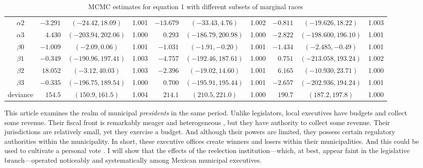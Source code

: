 \begin{table}
{\begin{tabular}{c|rcr|rcr|rcr}
$\alpha2$& $ -3.291$ &   $(-24.42, 18.09)$ & 1.001 & $-13.679$ &         $(-33.43, 4.76)$ & 1.002 & $-0.811$ &        $(-19.626, 18.22)$ & 1.003 \\
$\alpha3$& $  4.430$ & $(-203.94, 202.06)$ & 1.000 & $  0.293$ &      $(-186.79, 200.98)$ & 1.000 & $-2.822$ &      $(-198.600, 196.10)$ & 1.001 \\
 $\beta0$& $ -1.009$ &     $(-2.09, 0.06)$ & 1.001 & $ -1.031$ &         $(-1.91, -0.20)$ & 1.001 & $-1.434$ &         $(-2.485, -0.49)$ & 1.001 \\
 $\beta1$& $ -0.349$ & $(-190.96, 197.41)$ & 1.003 & $ -4.757$ &      $(-192.46, 187.61)$ & 1.000 & $ 0.751$ &      $(-213.058, 193.24)$ & 1.002 \\
 $\beta2$& $ 18.052$ &    $(-3.12, 40.03)$ & 1.003 & $ -2.396$ &        $(-19.02, 14.60)$ & 1.001 & $ 6.165$ &        $(-10.930, 23.71)$ & 1.000 \\
 $\beta3$& $ -0.335$ & $(-196.75, 189.54)$ & 1.000 & $  0.700$ &      $(-195.91, 195.44)$ & 1.001 & $-2.657$ &      $(-202.936, 194.24)$ & 1.001 \\
deviance  & $  154.5$ &      $(150.9, 161.5)$ & 1.004 & $  214.1$ &           $(210.5, 221.0)$ & 1.000 & $ 190.7$ &           $(187.2, 197.8)$ & 1.000 \\ \hline
\end{tabular}
}
\caption{MCMC estimates for equation 1 with different subsets of marginal races}
\end{table}











This article examines the realm of municipal \emph{presidents} in the same period. Unlike legislators, local executives have budgets and collect some revenue. Their fiscal front is remarkably meager and heterogeneous \citep{diaz.cayeros.2006}, but they have authority to collect some revenue. Their jurisdictions are relatively small, yet they exercise a budget. And although their powers are limited, they possess certain regulatory authorities within the municipality. In short, these executive offices create winners and losers within their municipalities. And this could be used to cultivate a personal vote \citep{cain.etal.1987,carey.shugart.1995}. I will show that the effects of the reelection institution—which, at best, appear faint in the legislative branch—operated noticeably and systematically among Mexican municipal executives.










